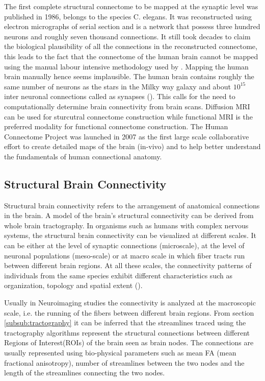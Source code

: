 \documentclass[msthesis.tex]{subfiles}
\begin{document}
The first complete structural connectome to be mapped at the synaptic level was published in 1986,  belongs to the species C. elegans. It was reconstructed using electron micrographs of serial section and is a network that possess three hundred neurons and roughly seven thousand connections. It still took decades to claim the biological plausibility of all the connections in the reconstructed connectome\cite{elegans}, this leads to the fact that the connectome of the human brain cannot be mapped using the manual labour intensive methodology used by \cite{white1986structure}. Mapping the human brain manually hence seems implausible. The human brain contains roughly the same number of neurons as the stars in the Milky way galaxy and about $10^{15}$ inter neuronal connections called as synapses (\cite{fornito2015connectomics}). This calls for the need to computationally determine brain connectivity from brain scans. Diffusion MRI can be used for sturcutral connectome construction while functional MRI is the preferred modality for functional connectome construction. The Human Connectome Project was launched in 2007 as the first large scale collaborative effort to create detailed maps of the brain (in-vivo) and to help better understand the fundamentals of human connectional anatomy.

\subsection{Structural Brain Connectivity}
Structural brain connectivity refers to the arrangement of anatomical connections in the brain. A model of the brain's structural connectivity can be derived from whole brain tractography. In organisms such as humans with complex nervous systems, the structural brain connectivity can be visualized at different scales. It can be either at the level of synaptic connections (microscale), at the level of neuronal populations (meso-scale) or at macro scale in which fiber tracts run between different brain regions. At all these scales, the connectivity patterns of individuals from the same species exhibit different characteristics such as organization, topology and spatial extent (\cite{Sporns:2007}).

Usually in Neuroimaging studies the connectivity is analyzed at the macroscopic scale, i.e. the running of the fibers between different brain regions.  From section \autoref{subsub:tractography} it can be inferred that the streamlines traced using the tractography algorithms represent the structural connections between different Regions of Interest(ROIs) of the brain seen as brain nodes. The connections are usually represented using bio-physical parameters such as mean FA (mean fractional anisotropy), number of streamlines between the two nodes and the length of the streamlines connecting the two nodes.
\end{document}

